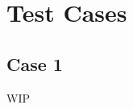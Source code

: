 \documentclass[sn-mathphys,Numbered]{sn-jnl}%
\newcommand{\bb}{\boldsymbol}
\begin{document}
\section{Test Cases}\label{sec:test_cases}


\subsection{Case 1} \label{sec:case1}
WIP

%			
\end{document}
